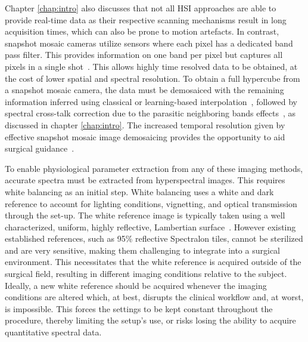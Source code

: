 Chapter \ref{chap:intro} also discusses that not all HSI approaches are able to provide real-time data as their respective scanning mechanisms result in long acquisition times, which can also be prone to motion artefacts. In contrast, snapshot mosaic cameras utilize sensors where each pixel has a dedicated band pass filter. This provides information on one band per pixel but captures all pixels in a single shot~\citep{Geelen2014}. This allows highly time resolved data to be obtained, at the cost of lower spatial and spectral resolution. To obtain a full hypercube from a snapshot mosaic camera, the data must be demosaiced with the remaining information inferred using classical or learning-based interpolation~\citep{Li2021}, followed by spectral cross-talk correction due to the parasitic neighboring bands effects~\citep{Pichette2017}, as discussed in chapter \ref{chap:intro}. The increased temporal resolution given by effective snapshot mosaic image demosaicing provides the opportunity to aid surgical guidance~\citep{Ayala2021, Ebner2021}.

To enable physiological parameter extraction from any of these imaging methods, accurate spectra must be extracted from hyperspectral images. This requires white balancing as an initial step. White balancing uses a white and dark reference to account for lighting conditions, vignetting, and optical transmission through the set-up.
The white reference image is typically taken using a well characterized, uniform, highly reflective, Lambertian surface~\citep{Lu2014}.
However existing established references, such as 95\% reflective Spectralon tiles, cannot be sterilized and are very sensitive, making them challenging to integrate into a surgical environment.
This necessitates that the white reference is acquired outside 
%
of the surgical field, resulting in different imaging conditions relative to the subject.
Ideally, a new white reference should be acquired whenever the imaging conditions are altered which, at best, disrupts the clinical workflow and, at worst, is impossible. This forces the settings to be kept constant throughout the procedure, thereby limiting the setup's use, or risks losing the ability to acquire quantitative spectral data. 

